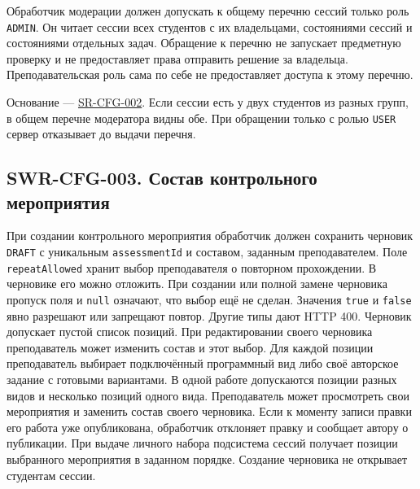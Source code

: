\documentclass[12pt,a4paper]{article}
\begin{document}
\hypertarget{swr-cfg-002-чтение-сессий-всех-студентов}{}

\hypertarget{swr-cfg-002}{}

Обработчик модерации должен допускать к общему перечню сессий только роль \texttt{ADMIN}. Он читает сессии всех студентов с их владельцами, состояниями сессий и состояниями отдельных задач. Обращение к перечню не запускает предметную проверку и не предоставляет права отправить решение за владельца. Преподавательская роль сама по себе не предоставляет доступа к этому перечню.

Основание --- {\href{../04\_Системные\_требования/DOC-05\_Системные\_требования.pdf\#sr-cfg-002}{SR-CFG-002}}. Если сессии есть у двух студентов из разных групп, в общем перечне модератора видны обе. При обращении только с ролью \texttt{USER} сервер отказывает до выдачи перечня.

\subsection{SWR-CFG-003. Состав контрольного мероприятия}\label{swr-cfg-003-ux441ux43eux441ux442ux430ux432-ux43aux43eux43dux442ux440ux43eux43bux44cux43dux43eux433ux43e-ux43cux435ux440ux43eux43fux440ux438ux44fux442ux438ux44f}

\hypertarget{swr-cfg-003-состав-контрольного-мероприятия}{}

\hypertarget{swr-cfg-003}{}

При создании контрольного мероприятия обработчик должен сохранить черновик \texttt{DRAFT} с уникальным \texttt{assessment\allowbreak{}Id} и составом, заданным преподавателем. Поле \texttt{repeat\allowbreak{}Allowed} хранит выбор преподавателя о повторном прохождении. В черновике его можно отложить. При создании или полной замене черновика пропуск поля и \texttt{null} означают, что выбор ещё не сделан. Значения \texttt{true} и \texttt{false} явно разрешают или запрещают повтор. Другие типы дают HTTP 400. Черновик допускает пустой список позиций. При редактировании своего черновика преподаватель может изменить состав и этот выбор. Для каждой позиции преподаватель выбирает подключённый программный вид либо своё авторское задание с готовыми вариантами. В одной работе допускаются позиции разных видов и несколько позиций одного вида. Преподаватель может просмотреть свои мероприятия и заменить состав своего черновика. Если к моменту записи правки его работа уже опубликована, обработчик отклоняет правку и сообщает автору о публикации. При выдаче личного набора подсистема сессий получает позиции выбранного мероприятия в заданном порядке. Создание черновика не открывает студентам сессии.
\end{document}
